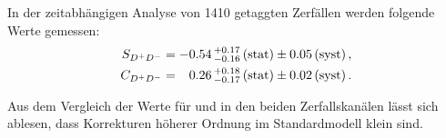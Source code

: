 In der zeitabhängigen Analyse von \num{1410} getaggten \BdToDD Zerfällen werden folgende Werte gemessen:
\begin{align*}
  S_{{{D}^+}{{D}^-}} &=  -0.54 \, ^{+0.17}_{-0.16} \, \text{(stat)} \pm 0.05 \, \text{(syst)}\,, \\
  C_{{{D}^+}{{D}^-}} &=  \phantom{-}0.26 \, ^{+0.18}_{-0.17} \, \text{(stat)} \pm 0.02 \, \text{(syst)}\,.
\end{align*}

Aus dem Vergleich der Werte für \Sf und \Cf in den beiden Zerfallskanälen
lässt sich ablesen, dass Korrekturen höherer Ordnung im Standardmodell klein
sind.
